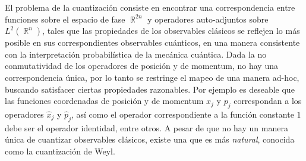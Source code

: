 \documentclass[a4paper]{report}
\DeclareMathOperator{\R}{\mathbb{R}}
\begin{document}
  El problema de la cuantización consiste en encontrar una
  correspondencia entre funciones sobre el espacio de fase
  $\R^{2n}$ y operadores auto-adjuntos sobre $L^2(\R^{n})$,
  tales que las propiedades de los observables clásicos se
  reflejen lo más posible en sus correspondientes
  observables cuánticos, en una manera consistente con la
  interpretación probabilística de la mecánica cuántica.
  Dada la no conmutatividad de los operadores de posición y
  de momentum, no hay una correspondencia única, por lo
  tanto se restringe el mapeo de una manera ad-hoc, buscando
  satisfacer ciertas propiedades razonables. Por ejemplo es
  deseable que las funciones coordenadas de posición y de
  momentum $x_j$ y $p_j$ correspondan a los operadores
  $\hat{x}_j$ y $\hat{p}_j$, así como el operador
  correspondiente a la función constante $1$ debe ser el
  operador identidad, entre otros.  A pesar de que no hay un
  manera única de cuantizar observables clásicos, existe una
  que es más \textit{natural}, conocida como la cuantización
  de Weyl. 
\end{document}
